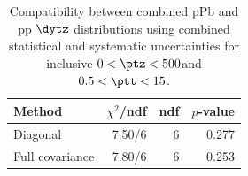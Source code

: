 \begin{table}[htp!]
\centering
\begin{tabular}{|l|r|r|r|}
\hline
Method & $\chi^2$/ndf & ndf & $p$-value \\
\hline
Diagonal & 7.50/6 & 6 & 0.277 \\
Full covariance & 7.80/6 & 6 & 0.253 \\
\hline
\end{tabular}
\caption{Compatibility between combined pPb and pp $\dytz$ distributions using combined statistical and systematic uncertainties for inclusive $0 < \ptz < 500$\GeV and $0.5 < \ptt < 15$\GeV.}
\label{table:chisq_deta}
\end{table}
